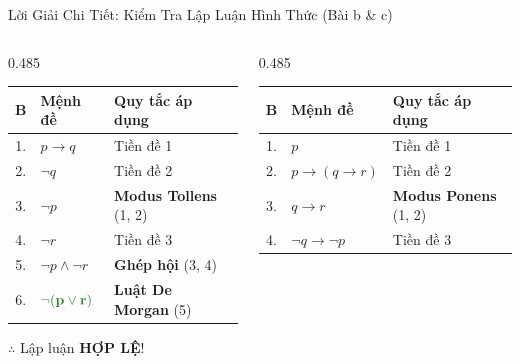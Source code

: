 \documentclass[aspectratio=169, 10pt]{beamer}
\begin{document}
\begin{frame}{Lời Giải Chi Tiết: Kiểm Tra Lập Luận Hình Thức (Bài b \& c)}
  \begin{columns}[t, onlytextwidth]
    \begin{column}{0.485\textwidth}
      \begin{cozyExample}
        \centering
        \renewcommand{\arraystretch}{1.03}
        \footnotesize
        \setlength{\tabcolsep}{2.5pt}
        \begin{tabular}{cll}
          \toprule
          \textbf{B} & \textbf{Mệnh đề} & \textbf{Quy tắc áp dụng} \\
          \midrule
          1. & $p \to q$ & Tiền đề 1 \\
          2. & $\neg q$ & Tiền đề 2 \\
          3. & $\neg p$ & \textbf{Modus Tollens} (1, 2) \\
          4. & $\neg r$ & Tiền đề 3 \\
          5. & $\neg p \land \neg r$ & \textbf{Ghép hội} (3, 4) \\
          6. & $\mathbf{\textcolor{cozyTrue}{\neg(p \lor r)}}$ & \textbf{Luật De Morgan} (5) \\
          \bottomrule
        \end{tabular}
        \par\vspace{0.05cm}
        \centering\footnotesize\color{cozyTrue}$\therefore$ Lập luận \textbf{HỢP LỆ}!
      \end{cozyExample}
    \end{column}
    \begin{column}{0.485\textwidth}
      \begin{cozyExample}
        \centering
        \renewcommand{\arraystretch}{1.03}
        \footnotesize
        \setlength{\tabcolsep}{2.5pt}
        \begin{tabular}{cll}
          \toprule
          \textbf{B} & \textbf{Mệnh đề} & \textbf{Quy tắc áp dụng} \\
          \midrule
          1. & $p$ & Tiền đề 1 \\
          2. & $p \to (q \to r)$ & Tiền đề 2 \\
          3. & $q \to r$ & \textbf{Modus Ponens} (1, 2) \\
          4. & $\neg q \to \neg p$ & Tiền đề 3 \\

\end{tabular}
\end{cozyExample}
\end{column}
\end{columns}
\end{frame}
\end{document}
